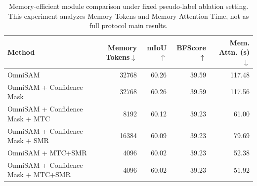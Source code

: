 \begin{table}[t]
  \centering
  \small
  \setlength{\tabcolsep}{4pt}
  \renewcommand{\arraystretch}{1.08}
  \caption{Memory-efficient module comparison under fixed pseudo-label ablation setting. This experiment analyzes Memory Tokens and Memory Attention Time, not as full protocol main results.}
  \label{tab:memory_ablation}
  \begin{tabular}{lrrrr}
    \toprule
    Method & Memory Tokens$\downarrow$ & mIoU$\uparrow$ & BFScore$\uparrow$ & Mem. Attn. (s)$\downarrow$ \\
    \midrule
    OmniSAM & 32768 & 60.26 & 39.59 & 117.48 \\
    OmniSAM + Confidence Mask & 32768 & 60.26 & 39.59 & 117.56 \\
    OmniSAM + Confidence Mask + MTC & 8192 & 60.12 & 39.23 & 61.00 \\
    OmniSAM + Confidence Mask + SMR & 16384 & 60.09 & 39.23 & 79.69 \\
    OmniSAM + MTC+SMR & 4096 & 60.02 & 39.23 & 52.38 \\
    OmniSAM + Confidence Mask + MTC+SMR & 4096 & 60.02 & 39.23 & 51.92 \\
    \bottomrule
  \end{tabular}
\end{table}
